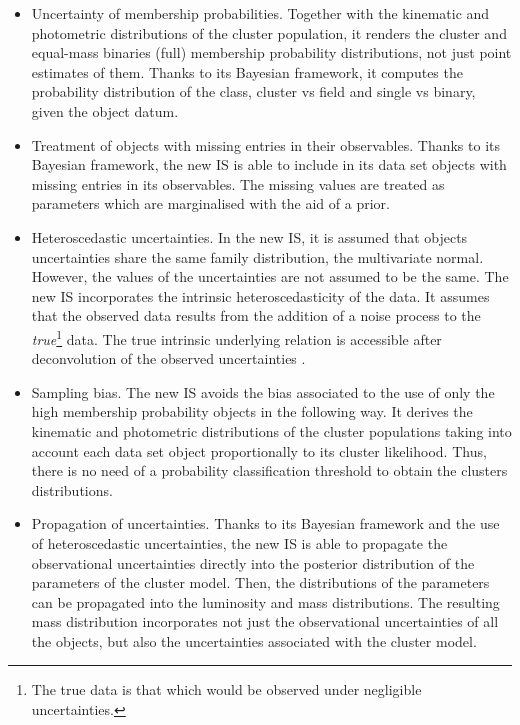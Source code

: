 \begin{itemize}
\item Uncertainty of membership probabilities. Together with the kinematic and photometric distributions of the cluster population, it renders the cluster and equal-mass binaries (full) membership probability distributions, not just point estimates of them. Thanks to its Bayesian framework, it computes the probability distribution of the class, cluster vs field and single vs binary, given the object datum. 

\item Treatment of objects with missing entries in their observables. Thanks to its Bayesian framework, the new IS is able to include in its data set objects with missing entries in its observables. The missing values are treated as parameters which are marginalised with the aid of a prior.

\item Heteroscedastic uncertainties. In the new IS, it is assumed that objects uncertainties share the same family distribution, the multivariate normal. However, the values of the uncertainties are not assumed to be the same. The new IS incorporates the intrinsic heteroscedasticity of the data. It assumes that the observed data results from the addition of a noise process to the \emph{true}\footnote{The true data is that which would be observed under negligible uncertainties.} data. The true intrinsic underlying relation is accessible after deconvolution of the observed uncertainties \cite[see][for another example of deconvolution]{2009ApJ...700.1794B}.

\item Sampling bias. The new IS avoids the bias associated to the use of only the high membership probability objects in the following way. It derives the kinematic and photometric distributions of the cluster populations taking into account each data set object proportionally to its cluster likelihood. Thus, there is no need of a probability classification threshold to obtain the clusters distributions.

\item Propagation of uncertainties. Thanks to its Bayesian framework and the use of heteroscedastic uncertainties, the new IS is able to propagate the observational uncertainties directly into the posterior distribution of the parameters of the cluster model. Then, the distributions of the parameters can be propagated into the luminosity and mass distributions. The resulting mass distribution incorporates not just the observational uncertainties of all the objects, but also the uncertainties associated with the cluster model. 
\end{itemize}

